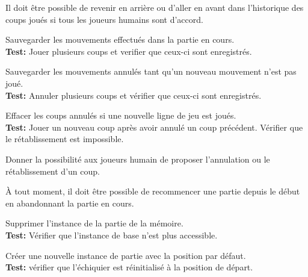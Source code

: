\documentclass{article}
\begin{document}
\begin{needbox}
    Il doit être possible de revenir en arrière ou d'aller en avant dans l'historique des coups joués si tous les joueurs humains sont d'accord.
    \begin{subneedbox}
        Sauvegarder les mouvements effectués dans la partie en cours.\\
        \textbf{Test:} Jouer plusieurs coups et verifier que ceux-ci sont enregistrés.
    \end{subneedbox}
    \begin{subneedbox}
        Sauvegarder les mouvements annulés tant qu'un nouveau mouvement n'est pas joué.\\
        \textbf{Test:} Annuler plusieurs coups et vérifier que ceux-ci sont enregistrés.
    \end{subneedbox}
    \begin{subneedbox}
        Effacer les coups annulés si une nouvelle ligne de jeu est joués.\\
        \textbf{Test:} Jouer un nouveau coup après avoir annulé un coup précédent. Vérifier que le rétablissement est impossible.
    \end{subneedbox}
    \begin{subneedbox}
        Donner la possibilité aux joueurs humain de proposer l'annulation ou le rétablissement d'un coup.
    \end{subneedbox}
\end{needbox}

\begin{needbox}
    À tout moment, il doit être possible de recommencer une partie depuis le début en abandonnant la partie en cours.
    \begin{subneedbox}
        Supprimer l'instance de la partie de la mémoire.\\
        \textbf{Test:} Vérifier que l'instance de base n'est plus accessible.
    \end{subneedbox}
    \begin{subneedbox}
        Créer une nouvelle instance de partie avec la position par défaut.\\
        \textbf{Test:} vérifier que l'échiquier est réinitialisé à la position de départ.
    \end{subneedbox}
\end{needbox}
\end{document}

